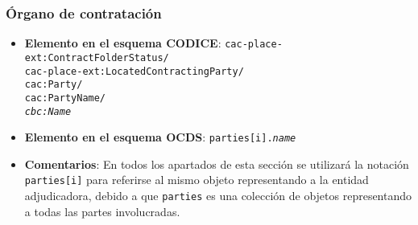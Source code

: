         \subsubsection{Órgano de contratación}
            \begin{itemize}
                \item \textbf{Elemento en el esquema CODICE}:
                    \tabto{7.6cm} \texttt{cac-place-ext:ContractFolderStatus/} \\
                    \tabto{7.6cm} \texttt{cac-place-ext:LocatedContractingParty/} \\
                    \tabto{7.6cm} \texttt{cac:Party/} \\
                    \tabto{7.6cm} \texttt{cac:PartyName/} \\
                    \tabto{7.6cm} \texttt{\textit{cbc:Name}}
                \item \textbf{Elemento en el esquema OCDS}:
                    \tabto{7.6cm} \texttt{parties[i].\textit{name}}
                \item \textbf{Comentarios}: En todos los apartados de esta sección se utilizará la notación \texttt{parties[i]} para referirse al mismo objeto representando a la entidad adjudicadora, debido a que \texttt{parties} es una colección de objetos representando a todas las partes involucradas.
            \end{itemize}
        
